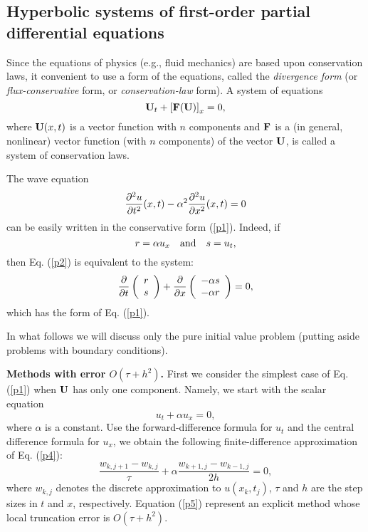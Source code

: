 \subsection{Hyperbolic systems of first-order
partial differential equations}

\vskip 0.3cm
 
Since the equations of physics (e.g., fluid mechanics) are
based upon conservation laws, it convenient to use a form of the equations,
called the {\it divergence form} (or {\it flux-conservative} form, or
{\it conservation-law} form).
A system of equations
\begin{equation}
{\bf U}_{t} + \left[{\bf F}({\bf U})\right]_{x} =0, \label{p1}
\end{equation}
where ${\bf U}(x,t)$ is a vector function with $n$ components and ${\bf F}$ is a
(in general, nonlinear) vector function (with $n$ components) of the vector
${\bf U}$, is called a system of conservation laws.

\vskip 0.3cm
 
The wave equation
\begin{equation}
\frac{{\partial}^{2} u}{{\partial} t^{2}}(x,t) - \alpha^{2}\frac{{\partial}^{2} u}{{\partial} x^{2}}(x,t)=0  \label{p2}
\end{equation}
can be easily written in the conservative form (\ref{p1}). Indeed, if
\[
r=\alpha u_{x} \quad {\rm and} \quad s=u_{t},
\]
then Eq. (\ref{p2}) is equivalent to the system:
\begin{equation}
\frac{{\partial}}{{\partial} t}
\left(
\begin{array}{c}
r \\
s
\end{array}
\right) +
\frac{{\partial}}{{\partial} x}
\left(
\begin{array}{c}
-\alpha s \\
-\alpha r
\end{array}
\right)=0, \label{p3}
\end{equation}
which has the form of Eq. (\ref{p1}).

\vskip 0.3cm
 
In what follows we will discuss only the pure initial value problem
(putting aside problems with boundary conditions).

 
 
{\bf Methods with error $O(\tau +h^2)$.} First we consider the simplest case of Eq. (\ref{p1}) when ${\bf U}$ has only
one component. Namely, we start with the scalar equation
\begin{equation}
u_{t} + \alpha u_{x} =0, \label{p4}
\end{equation}
where $\alpha$ is a constant. Use the forward-difference formula
for $u_{t}$ and the central difference formula for $u_{x}$, we obtain
the following finite-difference approximation of Eq. (\ref{p4}):
\begin{equation}
\frac{w_{k,j+1}-w_{k,j}}{\tau} + \alpha \frac{w_{k+1,j}-w_{k-1,j}}{2h} =0, \label{p5}
\end{equation}
where $w_{k,j}$ denotes the discrete approximation to $u(x_{k},t_{j})$, $\tau$ and $h$
are the step sizes in $t$ and $x$, respectively. Equation (\ref{p5})
represent an explicit method whose local truncation error is $O(\tau+h^2)$.


